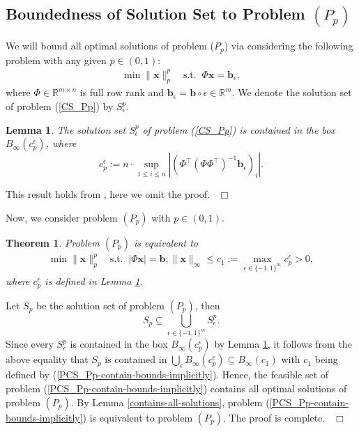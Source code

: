 \documentclass[12pt]{article}
\newtheorem{Theorem}{Theorem}[part]
\newtheorem{Lemma}{Lemma}[part]
\def \ep{\hbox{ }\hfill$\Box$}
\begin{document}
\subsection{Boundedness of Solution Set to Problem $(P_p)$}

\hspace{4mm} We will bound all optimal solutions of problem ($P_p$) via considering the following  problem with any given $p\in (0,1)$:
\begin{eqnarray}\label{CS_Pp}
\min \|\mathbf{x}\|_p^p\quad \textrm{s.t.}\;\; \Phi\mathbf{x}=\mathbf{b}_\epsilon,
\end{eqnarray}
where $\Phi\in\mathbb{R}^{m\times n}$ is full row rank and $\mathbf{b}_\epsilon=\mathbf{b}\circ\epsilon\in\mathbb{R}^m$. We denote the solution set of problem (\ref{CS_Pp}) by $S^p_\epsilon$.

\begin{Lemma}\label{CS-Lp-bounded}
The solution set $S^p_\epsilon$ of problem {\rm(\ref{CS_Pp})} is
contained in the box $B_\infty(c^\epsilon_p)$, where
$$
c^\epsilon_p:=n\cdot\sup\limits_{1\leqslant i\leqslant
n}|(\Phi^{\top}(\Phi\Phi^{\top})^{-1}\mathbf{b}_{\epsilon})_{i}|.
$$
\end{Lemma}

This result holds from \cite[Remark 1]{peng15equivalence_Lp}, here
we omit the proof.
\ep

Now, we consider problem $(P_p)$ with $p\in (0,1)$.
\begin{Theorem}\label{PCS-Lp-implicitly-has-bounds}
Problem $(P_p)$  is equivalent to
\begin{eqnarray}\label{PCS_Pp-contain-bounds-implicitly}
\min \|\mathbf{x}\|_{p}^{p}\quad \textrm{s.t.}\;\;|\Phi\mathbf{x}|=\mathbf{b}, \|\mathbf{x}\|_{\infty}\leqslant c_1:=\max\limits_{\epsilon\in\{-1,1\}^m}c^\epsilon_p>0,
\end{eqnarray}
where $c^\epsilon_p$ is defined in Lemma \ref{CS-Lp-bounded}.
\end{Theorem}

Let $S_p$ be the solution set of problem $(P_p)$, then
$$
S_p\subseteq \bigcup\limits_{\epsilon\in\{-1,1\}^m} S^{p}_\epsilon.
$$
Since every $S^{p}_\epsilon$ is contained in the box $B_\infty(c^\epsilon_p)$ by
Lemma \ref{CS-Lp-bounded}, it follows from the above equality that $S_{p}$ is contained in $\bigcup_\epsilon B_\infty(c^\epsilon_p)\subseteq B_\infty(c_1)$ with $c_1$ being defined by (\ref{PCS_Pp-contain-bounds-implicitly}). Hence, the feasible set of problem (\ref{PCS_Pp-contain-bounds-implicitly}) contains all optimal solutions of problem $(P_p)$. By Lemma \ref{contains-all-solutions}, problem (\ref{PCS_Pp-contain-bounds-implicitly}) is equivalent to problem $(P_p)$. The proof is complete.
\ep
\end{document}
